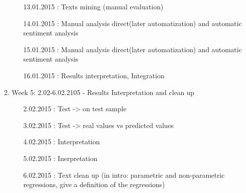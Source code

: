 \documentclass {article}
\begin{document}
\begin{enumerate}
\begin{enumerate}
		\item[13.01.2015]: Texts mining (manual evaluation)
		\item[14.01.2015]: Manual analysis direct(later automatization) and automatic sentiment analysis
		\item[15.01.2015]: Manual analysis direct(later automatization) and automatic sentiment analysis
		\item[16.01.2015]: Results interpretation, Integration 
	\end{enumerate}
	\item Week 5: 2.02-6.02.2105 - Results Interpretation and clean up
	\begin{enumerate}
		\item[2.02.2015]: Test -> on test sample
		\item[3.02.2015]: Test -> real values vs predicted values 
		\item[4.02.2015]: Interpretation
		\item[5.02.2015]: Inerpretation
		\item[6.02.2015]: Text clean up (in intro: parametric and non-parametric regressions, give a definition of the regressions)
	\end{enumerate}
\end{enumerate}
\end{document}

